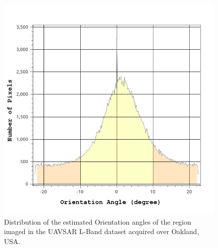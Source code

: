 \begin{figure} [tbp]
	\centering
	\includegraphics[width = 0.45\columnwidth]{Figures/Trento/orientation_RS2}
	\caption[PolSAR data preprocessing]{Distribution of the estimated Orientation angles of the region imaged in the UAVSAR L-Band dataset acquired over Oakland, USA.}
	\label{fig:orientationHist}
\end{figure} 
%
